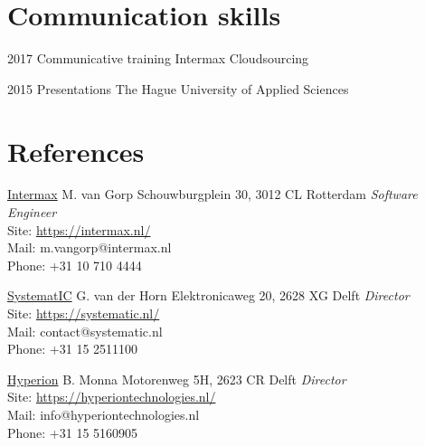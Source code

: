 \documentclass[]{friggeri-cv}
\begin{document}

\section{Communication skills}

\begin{entrylist}


\entry
{2017}
{Communicative training}
{Intermax Cloudsourcing}


\entry
{2015}
{Presentations}
{The Hague University of Applied Sciences}


\end{entrylist}

\newpage{}


\section{References}

\begin{entrylist}

\entry
{\href{https://intermax.nl}{Intermax}}
{M. van Gorp}
{Schouwburgplein 30, 3012 CL Rotterdam }
{\emph{Software Engineer} \\
Site: \href{https://intermax.nl}{https://intermax.nl/} \\
Mail: m.vangorp@intermax.nl \\
Phone: +31 10 710 4444}

\entry
{\href{https://systematic.nl}{SystematIC}}
{G. van der Horn}
{Elektronicaweg 20, 2628 XG Delft}
{\emph{Director} \\
Site: \href{https://systematic.nl/}{https://systematic.nl/} \\
Mail: contact@systematic.nl \\
Phone: +31 15 2511100}

\entry
{\href{https://hyperiontechnologies.nl/}{Hyperion}}
{B. Monna}
{Motorenweg 5H, 2623 CR Delft}
{\emph{Director} \\
Site: \href{https://hyperiontechnologies.nl/}{https://hyperiontechnologies.nl/} \\
Mail: info@hyperiontechnologies.nl \\
Phone: +31 15 5160905}

\end{entrylist}

\end{document}
